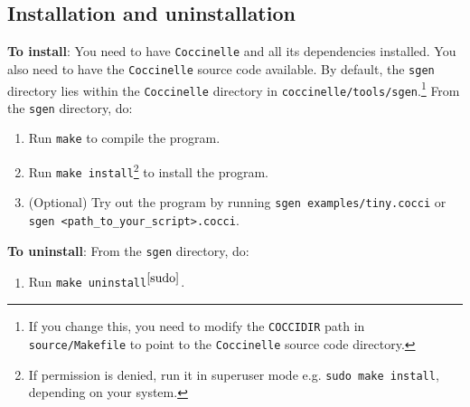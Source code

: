 \subsection{Installation and uninstallation}
\textbf{To install}: You need to have \texttt{Coccinelle} and all its dependencies installed. You also need to have the \texttt{Coccinelle} source code available. By default, the \texttt{sgen} directory lies within the \texttt{Coccinelle} directory in \texttt{coccinelle/tools/sgen}.\footnote{If you change this, you need to modify the \texttt{COCCIDIR} path in \texttt{source/Makefile} to point to the \texttt{Coccinelle} source code directory.} From the \texttt{sgen} directory, do:
\begin{enumerate}
\item Run \texttt{make} to compile the program.
\item Run \texttt{make install}\footnote{If permission is denied, run it in superuser mode e.g. \texttt{sudo make install}, depending on your system.\label{sudo}} to install the program.
\item (Optional) Try out the program by running \texttt{sgen examples/tiny.cocci} or \texttt{sgen <path\_to\_your\_script>.cocci}.
\end{enumerate}
\textbf{To uninstall}: From the \texttt{sgen} directory, do:
\begin{enumerate}
\item Run \texttt{make uninstall}$^{\ref{sudo}}$. 
\end{enumerate}
\bigskip

